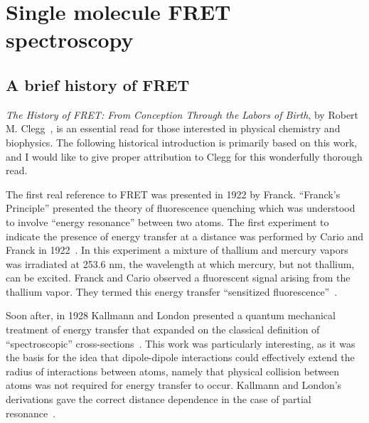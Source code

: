 \chapter{Single molecule FRET spectroscopy
\label{chpt:smFRET}}

\section{A brief history of FRET
\label{sec:smFRET}}

\textit{The History of FRET: From Conception Through the Labors of Birth}, by Robert M. Clegg~\cite{clegg_history}, is an essential read for those interested in physical chemistry and biophysics. 
The following historical introduction is primarily based on this work, and I would like to give proper attribution to Clegg for this wonderfully thorough read.

The first real reference to \ac{FRET} was presented in 1922 by Franck. 
\enquote{Franck's Principle} presented the theory of fluorescence quenching which was understood to involve \enquote{energy resonance} between two atoms.
The first experiment to indicate the presence of energy transfer at a distance was performed by Cario and Franck in 1922~\cite{clegg_history}. 
In this experiment a mixture of thallium and mercury vapors was irradiated at 253.6 nm, the wavelength at which mercury, but not thallium, can be excited.
Franck and Cario observed a fluorescent signal arising from the thallium vapor.
They termed this energy transfer \enquote{sensitized fluorescence}~\cite{clegg_history}.

Soon after, in 1928 Kallmann and London presented a quantum mechanical treatment of energy transfer that expanded on the classical definition of \enquote{spectroscopic} cross-sections~\cite{Kallmann_London}.
This work was particularly interesting, as it was the basis for the idea that dipole-dipole interactions could effectively extend the radius of interactions between atoms, namely that physical collision between atoms was not required for energy transfer to occur.
Kallmann and London's derivations gave the correct distance dependence in the case of partial resonance~\cite{clegg_history}. 

